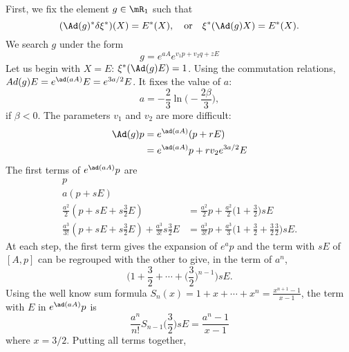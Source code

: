 First, we fix the element $g\in\mR_1$ such that \label{PgAdgXEbbekl}
\begin{equation}
	(\Ad(g)^*\delta\xi^*)(X)=E^*(X),\quad\text{or}\quad  \xi^*(\Ad(g)X)=E^*(X).
\end{equation}
We search $g$ under the form
\[
	g= e^{aA} e^{v_1p+v_2q+zE}
\]
Let us begin with $X=E$: $\xi^*(\Ad(g)E)=1$. Using the commutation relations, $Ad(g)E= e^{\ad(aA)}E= e^{3a/2}E$. It fixes the value of $a$:
\begin{equation}   \label{Eqleadegxistar}
	a=-\frac{ 2 }{ 3 }\ln\big( -\frac{ 2\beta }{ 3 } \big),
\end{equation}
if $\beta<0$. The parameters $v_1$ and $v_2$ are more difficult:
\[
	\begin{split}
		\Ad(g)p&= e^{\ad(aA)}(p+rE)\\
		&= e^{\ad(aA)}p+rv_2 e^{3a/2}E
	\end{split}
\]
The first terms of $ e^{\ad(aA)}p$ are
\begin{subequations}  \label{EqPremtermsAdgp}
	\begin{align}
		p                                                                                                                                                                                    \\
		a(p+sE)                                                                                                                                                                              \\
		\frac{ a^{2} }{2}(p+sE+s\frac{ 3 }{2}E)                                        & =\frac{ a^{2} }{2}p+\frac{ a^{2} }{2}\big( 1+\frac{ 3 }{2} \big)sE                                  \\
		\frac{ a^{3} }{ 3! }(p+sE+s\frac{ 3 }{2}E)+\frac{ a^{3} }{ 3! }s\frac{ 3 }{2}E & =\frac{ a^{3} }{ 3! }p+\frac{ a^{3} }{ 3 }\big( 1+\frac{ 3 }{2}+\frac{ 3 }{2}\frac{ 3 }{2} \big)sE.
	\end{align}
\end{subequations}
At each step, the first term gives the expansion of $ e^{a}p$ and the term with $sE$ of $[A,p]$ can be regrouped with the other to give, in the term of $a^{n}$,
\[
	\big( 1+\frac{ 3 }{ 2 }+\cdots+\big( \frac{ 3 }{ 2 } \big)^{n-1} \big)sE.
\]
Using the well know sum formula $S_{n}(x)=1+x+\cdots+x^{n}=\frac{\displaystyle x^{n+1}-1 }{\displaystyle x-1 }$, the term with $E$ in $ e^{\ad(aA)}p$ is
\[
	\frac{ a^{n} }{ n! }S_{n-1}\big(\frac{ 3 }{2}\big)sE=\frac{ a^{n}-1 }{ x-1 }
\]
where $x=3/2$. Putting all terms together,
